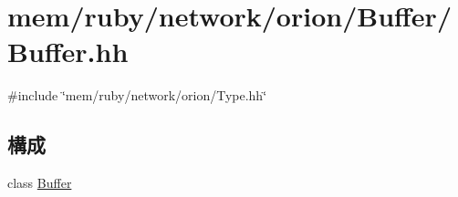 \hypertarget{Buffer_8hh}{
\section{mem/ruby/network/orion/Buffer/Buffer.hh}
\label{Buffer_8hh}
}
{\ttfamily \#include \char`\"{}mem/ruby/network/orion/Type.hh\char`\"{}}\par
\subsection*{構成}
\begin{DoxyCompactItemize}
\item 
class \hyperlink{classBuffer}{Buffer}
\end{DoxyCompactItemize}
